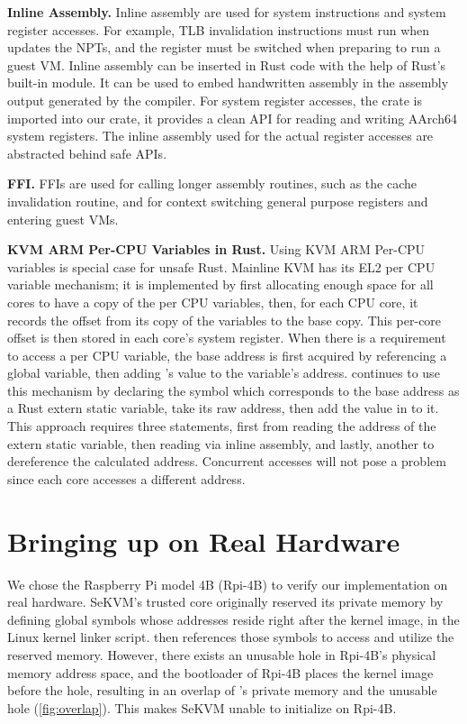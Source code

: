 \textbf{Inline Assembly.}
Inline assembly are used for system instructions and system register accesses.
For example, TLB invalidation instructions must run when \rustcore{} updates the
NPTs, and the  register must be switched when preparing to run
a guest VM.
Inline assembly can be inserted in Rust code with the help of Rust's built-in
 module. It can be used to embed handwritten assembly in
the assembly output generated by the compiler.
For system register accesses, the  crate
\cite{aarch64cpu} is imported into our \rustcore{} crate, it provides a clean
API for reading and writing AArch64 system registers. The inline assembly used
for the actual register accesses are abstracted behind safe APIs.

\textbf{FFI.}
FFIs are used for calling longer assembly routines, such as the cache
invalidation routine, and  for context switching general
purpose registers and entering guest VMs.

\textbf{KVM ARM Per-CPU Variables in Rust.}
Using KVM ARM Per-CPU variables is special case for unsafe Rust.
Mainline KVM has its EL2 per CPU variable mechanism; it is implemented by first
allocating enough space for all cores to have a copy of the per CPU variables,
then, for each CPU core, it records the offset from its copy of the variables to the
base copy. This per-core offset is then stored in each core's 
system register. When there is a requirement to access a per CPU variable, the
base address is first acquired by referencing a global variable, then adding
's value to the variable's address. \rustsec{} continues to use
this mechanism by declaring the symbol which corresponds to the base address as
a Rust extern static variable, take its raw address, then add the value in
 to it. This approach requires three  statements,
first from reading the address of the extern static variable, then reading
 via inline assembly, and lastly, another  to
dereference the calculated address. Concurrent accesses will not pose a problem
since each core accesses a different address.

\section{Bringing up \rustsec{} on Real Hardware}

We chose the Raspberry Pi model 4B (Rpi-4B) to verify our implementation on
real hardware.
SeKVM's trusted core \secore{} originally reserved its private memory by
defining global symbols whose addresses reside right after the kernel image,
in the Linux kernel linker script.
\secore{} then references those symbols to access and utilize the reserved
memory.
However, there exists an unusable hole in Rpi-4B's physical memory address
space, and the bootloader of Rpi-4B places the kernel image before the hole,
resulting in an overlap of \secore{}'s private memory and the unusable hole
(\autoref{fig:overlap}). This makes SeKVM unable to initialize on Rpi-4B.

